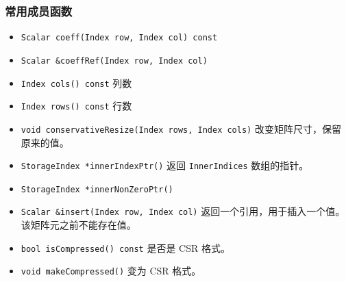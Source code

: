 \subsubsection{常用成员函数}
\begin{itemize}
\item \verb|Scalar coeff(Index row, Index col) const|
\item \verb|Scalar &coeffRef(Index row, Index col)|
\item \verb|Index cols() const| 列数
\item \verb|Index rows() const| 行数
\item \verb|void conservativeResize(Index rows, Index cols)| 改变矩阵尺寸，保留原来的值。
\item \verb|StorageIndex *innerIndexPtr()| 返回 \verb|InnerIndices| 数组的指针。
\item \verb|StorageIndex *innerNonZeroPtr()|
\item \verb|Scalar &insert(Index row, Index col)| 返回一个引用，用于插入一个值。该矩阵元之前不能存在值。
\item \verb|bool isCompressed() const| 是否是 CSR 格式。
\item \verb|void makeCompressed()| 变为 CSR 格式。
\end{itemize}
